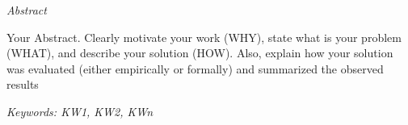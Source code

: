 \begin{center}
    \Large
    \textit{Abstract}
\end{center}

\vspace*{1cm}

\noindent Your Abstract. Clearly motivate your work (WHY), state what is your problem (WHAT), and describe your solution (HOW). Also, explain how your solution was evaluated (either empirically or formally) and summarized the observed results 
~

\noindent\textit{Keywords: KW1, KW2, KWn}
